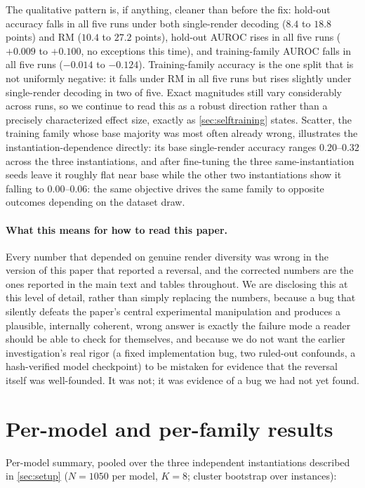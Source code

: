 \documentclass[11pt]{article}
\newcommand{\rmg}{\mathrm{RM}}
\begin{document}
The qualitative pattern is, if anything, cleaner than before the fix: hold-out accuracy falls in all five runs under both single-render decoding ($8.4$ to $18.8$ points) and $\rmg$ ($10.4$ to $27.2$ points), hold-out AUROC rises in all five runs ($+0.009$ to $+0.100$, no exceptions this time), and training-family AUROC falls in all five runs ($-0.014$ to $-0.124$). Training-family accuracy is the one split that is not uniformly negative: it falls under $\rmg$ in all five runs but rises slightly under single-render decoding in two of five. Exact magnitudes still vary considerably across runs, so we continue to read this as a robust direction rather than a precisely characterized effect size, exactly as \cref{sec:selftraining} states. Scatter, the training family whose base majority was most often already wrong, illustrates the instantiation-dependence directly: its base single-render accuracy ranges $0.20$--$0.32$ across the three instantiations, and after fine-tuning the three same-instantiation seeds leave it roughly flat near base while the other two instantiations show it falling to $0.00$--$0.06$: the same objective drives the same family to opposite outcomes depending on the dataset draw.

\paragraph{What this means for how to read this paper.} Every number that depended on genuine render diversity was wrong in the version of this paper that reported a reversal, and the corrected numbers are the ones reported in the main text and tables throughout. We are disclosing this at this level of detail, rather than simply replacing the numbers, because a bug that silently defeats the paper's central experimental manipulation and produces a plausible, internally coherent, wrong answer is exactly the failure mode a reader should be able to check for themselves, and because we do not want the earlier investigation's real rigor (a fixed implementation bug, two ruled-out confounds, a hash-verified model checkpoint) to be mistaken for evidence that the reversal itself was well-founded. It was not; it was evidence of a bug we had not yet found.

\section{Per-model and per-family results}
\label{app:per-model}

\noindent Per-model summary, pooled over the three independent instantiations described in \cref{sec:setup} ($N{=}1050$ per model, $K{=}8$; cluster bootstrap over instances):
\end{document}
